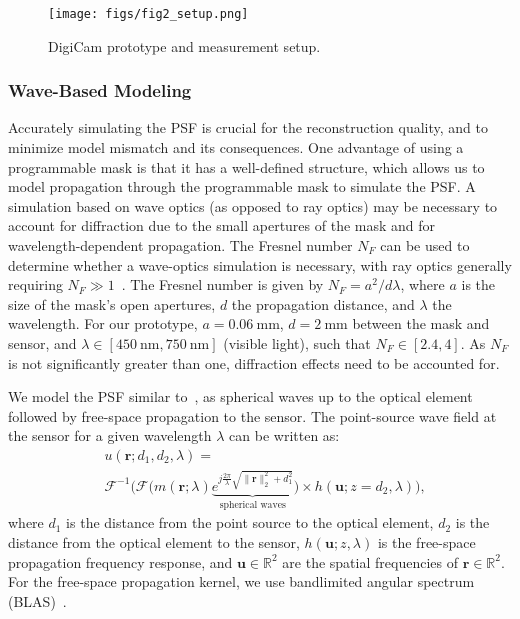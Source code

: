 \begin{figure}[t!]
		\centering
		\texttt{[image: figs/fig2\_setup.png]}
	\caption{DigiCam prototype and measurement setup.}
	\label{fig:prototype_labeled}
\end{figure}

\subsubsection{Wave-Based Modeling}

\noindent Accurately simulating the PSF is crucial for the reconstruction quality,
and to minimize model mismatch and its consequences.
One advantage of using a programmable mask is that it has a well-defined structure, 
which allows us to model propagation through the programmable mask to simulate the PSF.
A simulation based on wave optics (as opposed to ray optics) may be necessary to account for diffraction due to the small apertures of the mask and for wavelength-dependent propagation. 
The Fresnel number $ N_F $ can be used to determine whether a wave-optics simulation is necessary, with ray optics generally requiring $N_F\gg 1$~\cite{boominathan2022recent}.
The Fresnel number is given by $ N_F = a^2 / d\lambda $, where $ a $ is the size of the mask's open apertures, $ d $ the propagation distance, and $ \lambda $ the wavelength. 
For our prototype, $ a = \SI{0.06}{\milli\meter} $, $ d = \SI{2}{\milli\meter}$ between the mask and sensor, and $ \lambda \in [\SI{450}{\nano\meter}, \SI{750}{\nano\meter}] $ (visible light),
such that $ N_F \in [2.4, 4] $. 
As $N_F$ is not significantly greater than one, diffraction effects need to be accounted for.

We model the PSF similar to~\cite{sitzmann2018e2e}, \ie as spherical waves up to the optical element followed by free-space propagation to the sensor.
The point-source wave field at the sensor for a given wavelength $\lambda$
can be written as:
\begin{align}
	\label{eq:wavefield}
	&u(\bm{r}; d_1, d_2, \lambda) = \nonumber \\ 
	&\mathcal{F}^{-1}\Big(\mathcal{F} \Big( m(\bm{r}; \lambda) \underbrace{e^{j \frac{2\pi}{\lambda} \sqrt{\|\bm{r}\|_2^2 +  d_1^2}}}_{\text{spherical waves}}
	\Big) \times h(\bm{u}; z=d_2, \lambda) \Big),
\end{align}
where 
$d_1$ is the distance from the point source to the optical element,
$d_2$ is the distance from the optical element to the sensor,
$ h(\bm{u}; z, \lambda)$ is the free-space propagation frequency response, and
$\bm{u} \in \mathbb{R}^2$ are the spatial frequencies of $\bm{r} \in \mathbb{R}^2$.
For the free-space propagation kernel, we use bandlimited angular spectrum (BLAS)~\cite{Matsushima2009}.

